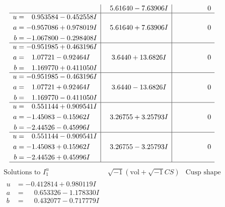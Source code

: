 \documentclass[1p]{elsarticle_modified}
\theoremstyle{definition}
\newcommand{\I}{\sqrt{-1}}
\begin{document}
$$\begin{array}{c|c|c}
 & \phantom{-}5.61640 - 7.63906 I & \phantom{-0.000000 } 0 \\ \hline\begin{aligned}
u &= \phantom{-}0.953584 - 0.452558 I \\
a &= -0.957086 + 0.978019 I \\
b &= -1.067800 - 0.298408 I\end{aligned}
 & \phantom{-}5.61640 + 7.63906 I & \phantom{-0.000000 } 0 \\ \hline\begin{aligned}
u &= -0.951985 + 0.463196 I \\
a &= \phantom{-}1.07721 - 0.92464 I \\
b &= \phantom{-}1.169770 + 0.411050 I\end{aligned}
 & \phantom{-}3.6440 + 13.6826 I & \phantom{-0.000000 } 0 \\ \hline\begin{aligned}
u &= -0.951985 - 0.463196 I \\
a &= \phantom{-}1.07721 + 0.92464 I \\
b &= \phantom{-}1.169770 - 0.411050 I\end{aligned}
 & \phantom{-}3.6440 - 13.6826 I & \phantom{-0.000000 } 0 \\ \hline\begin{aligned}
u &= \phantom{-}0.551144 + 0.909541 I \\
a &= -1.45083 - 0.15962 I \\
b &= -2.44526 - 0.45996 I\end{aligned}
 & \phantom{-}3.26755 + 3.25793 I & \phantom{-0.000000 } 0 \\ \hline\begin{aligned}
u &= \phantom{-}0.551144 - 0.909541 I \\
a &= -1.45083 + 0.15962 I \\
b &= -2.44526 + 0.45996 I\end{aligned}
 & \phantom{-}3.26755 - 3.25793 I & \phantom{-0.000000 } 0\\
 \hline 
 \end{array}$$\newpage$$\begin{array}{c|c|c}  
\text{Solutions to }I^u_{1}& \I (\text{vol} + \sqrt{-1}CS) & \text{Cusp shape}\\
 \hline 
\begin{aligned}
u &= -0.412814 + 0.980119 I \\
a &= \phantom{-}0.653326 - 1.178330 I \\
b &= \phantom{-}0.432077 - 0.717779 I\end{aligned}

\end{array}$$
\end{document}
